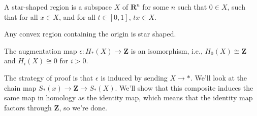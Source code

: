 \begin{definition}
A star-shaped region is a subspace $X$ of $\mathbf{R}^n$ for some $n$ such that $0\in X$, such that for all $x\in X$, and for all $t\in[0,1]$, $tx\in X$. 
\end{definition}
\begin{example}
Any convex region containing the origin is star shaped.
\end{example}
\begin{theorem}
The augmentation map $\epsilon: H_\ast(X)\to \mathbf{Z}$ is an isomorphism, i.e., $ H_0(X)\cong\mathbf{Z}$ and $ H_i(X)\cong 0$ for $i>0$.
\end{theorem}
The strategy of proof is that $\epsilon$ is induced by sending $X\to \ast$. We'll look at the chain map $S_\ast(x)\to\mathbf{Z}\to S_\ast(X)$. We'll show that this composite induces the same map in homology as the identity map, which means that the identity map factors through $\mathbf{Z}$, so we're done.

